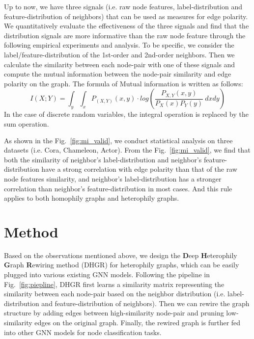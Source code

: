 \documentclass[sigconf]{acmart}
\begin{document}
	Up to now, we have three signals (i.e. raw node features, label-distribution and feature-distribution of neighbors) that can be used as measures for edge polarity. We quantitatively evaluate the effectiveness of the three signals and find that the distribution signals are more informative than the raw node feature through the following empirical experiments and analysis. To be specific, we consider the label/feature-distribution of the 1st-order and 2nd-order neighbors. Then we calculate the similarity between each node-pair with one of these signals and compute the mutual information between the node-pair similarity and edge polarity on the graph.
	The formula of Mutual information is written as follows:
	\begin{equation}
	I(X;Y) = \int_y\int_x P_{(X,Y)}(x,y)\cdot log\left( \frac{P_{X,Y}(x,y)}{P_X(x)P_Y(y)}\ dxdy \right)
	\end{equation}
	In the case of discrete random variables, the integral operation is replaced by the sum operation. 
	
	As shown in the Fig.~\ref{fig:mi_valid}, we conduct statistical analysis on three datasets (i.e. Cora, Chameleon, Actor). From the Fig.~\ref{fig:mi_valid}, we find that both the similarity of neighbor's label-distribution and neighbor's feature-distribution have a strong correlation with edge polarity than that of the raw node features similarity, and neighbor's label-distribution has a stronger correlation than neighbor's feature-distribution in most cases. And this rule applies to both homophily graphs and heterophily graphs. 	\section{Method}
	Based on the observations mentioned above, we design the \textbf{D}eep \textbf{H}eterophily \textbf{G}raph \textbf{R}ewiring method (DHGR) for heterophily graphs, which can be easily plugged into various existing GNN models. Following the pipeline in Fig.~\ref{fig:piepline}, DHGR first learns a similarity matrix representing the similarity between each node-pair based on the neighbor distribution (i.e. label-distribution and feature-distribution of neighbors). Then we can rewire the graph structure by adding edges between high-similarity node-pair and pruning low-similarity edges on the original graph. Finally, the rewired graph is further fed into other GNN models for node classification tasks.
	
	
\end{document}

